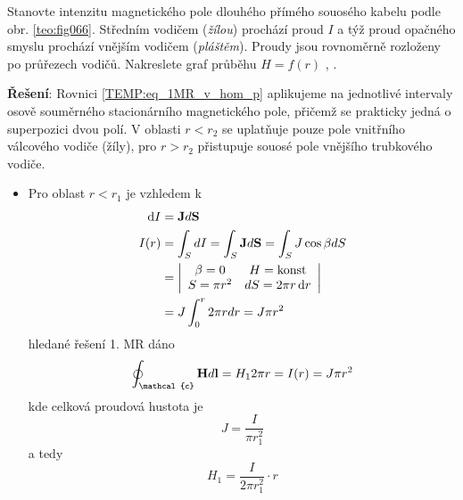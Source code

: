 \begin{mdframed}[style=mdexam]
  \begin{example}\label{TEMP:ex_koax_H}
    Stanovte intenzitu magnetického pole dlouhého přímého souosého kabelu podle obr.
    \ref{teo:fig066}. Středním vodičem (\emph{žílou}) prochází proud $I$ a týž proud
    opačného smyslu prochází vnějším vodičem (\emph{pláštěm}). Proudy jsou rovnoměrně rozloženy po
    průřezech vodičů. Nakreslete graf průběhu $H = f(r)$ \cite[s.~92]{Dufek1970},
    \cite[s.~195]{Kotlan1999}.
    
    {\centering
         \hspace{1em}
    \captionsetup{type=figure}  
    \label{teo:fig066}
    \par}
 
    \textbf{Řešení}: \newline Rovnici \ref{TEMP:eq_1MR_v_hom_p} aplikujeme na jednotlivé intervaly
    osově souměrného stacionárního magnetického pole, přičemž se prakticky jedná o superpozici dvou
    polí. V oblasti $r<r_2$ se uplatňuje pouze pole vnitřního válcového vodiče (žíly), pro $r>r_2$
    přistupuje souosé pole vnějšího trubkového vodiče.
    \begin{itemize}
      \item Pro oblast $r<r_1$ je vzhledem k 
            \begin{align*}
                \mathop{}\!\mathrm{d}I&= \mathbf{J}d\mathbf{S} \\
                I(r)  &= \int_S dI = \int_S \mathbf{J}d\mathbf{S} = \int_S J\cos\beta dS \\
                      &= \left\lvert\begin{array}{cc}
                                \beta = 0 & H = \text{konst}   \\
                              S = \pi r^2 & dS = 2\pi r\mathop{}\!\mathrm{d}r  \\
                              \end{array}
                        \right\rvert                                           \\
                      &= J\int_0^r 2\pi rdr = J\pi r^2
            \end{align*}
            hledané řešení 1. MR dáno 
            $$\oint_{\mathcal{c}}\vr{H}d\vr{l} = H_1 2\pi r = I(r) = J\pi r^2$$ kde celková proudová
            hustota je  $$J = \frac{I}{\pi r_1^2}$$ a tedy
            $$H_1 = \frac{I}{2\pi r_1^2}\cdot r$$
            

\end{itemize}
\end{example}
\end{mdframed}
